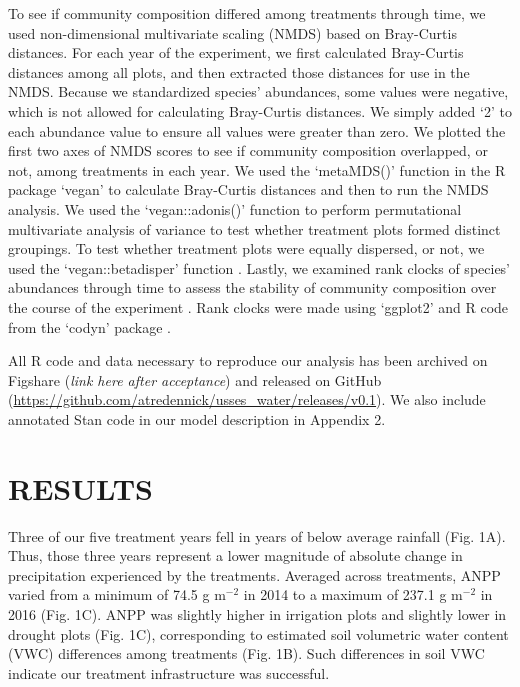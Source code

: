 \documentclass[fleqn,10pt]{wlpeerj} %
\begin{document}
To see if community composition differed among treatments through time,
we used non-dimensional multivariate scaling (NMDS) based on Bray-Curtis
distances. For each year of the experiment, we first calculated
Bray-Curtis distances among all plots, and then extracted those
distances for use in the NMDS. Because we standardized species'
abundances, some values were negative, which is not allowed for
calculating Bray-Curtis distances. We simply added `2' to each abundance
value to ensure all values were greater than zero. We plotted the first
two axes of NMDS scores to see if community composition overlapped, or
not, among treatments in each year. We used the `metaMDS()' function in
the R package `vegan' \citep{Oksanen2016} to calculate Bray-Curtis
distances and then to run the NMDS analysis. We used the
`vegan::adonis()' function \citep{Oksanen2016} to perform permutational
multivariate analysis of variance to test whether treatment plots formed
distinct groupings. To test whether treatment plots were equally
dispersed, or not, we used the `vegan::betadisper' function
\citep{Oksanen2016}. Lastly, we examined rank clocks of species'
abundances through time to assess the stability of community composition
over the course of the experiment \citep{Collins2008}. Rank clocks were
made using `ggplot2' \citep{Wickham2009} and R code from the `codyn'
package \citep{Hallett2016}.

All R code and data necessary to reproduce our analysis has been
archived on Figshare (\emph{link here after acceptance}) and released on
GitHub (\url{https://github.com/atredennick/usses_water/releases/v0.1}).
We also include annotated Stan code in our model description in Appendix
2.

\section{RESULTS}\label{results}

Three of our five treatment years fell in years of below average
rainfall (Fig. 1A). Thus, those three years represent a lower magnitude
of absolute change in precipitation experienced by the treatments.
Averaged across treatments, ANPP varied from a minimum of 74.5 g
m\(^{-2}\) in 2014 to a maximum of 237.1 g m\(^{-2}\) in 2016 (Fig. 1C).
ANPP was slightly higher in irrigation plots and slightly lower in
drought plots (Fig. 1C), corresponding to estimated soil volumetric
water content (VWC) differences among treatments (Fig. 1B). Such
differences in soil VWC indicate our treatment infrastructure was
successful.
\end{document}
